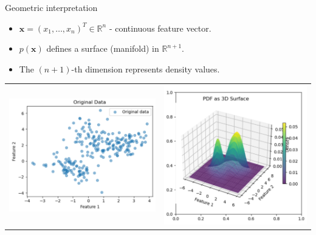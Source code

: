 \documentclass{beamer}
\newcommand{\x}{\mathbf{x}}
\begin{document}
\begin{frame}{Geometric interpretation}
  \begin{itemize}
  \item $\x = (x_1, \ldots, x_n)^T \in \mathbb{R}^n$ - continuous feature vector.
    \vspace{0.5cm}
  \item $p(\x)$ defines a surface (manifold) in $\mathbb{R}^{n+1}$.
    \vspace{0.5cm}
  \item The $(n+1)$-th dimension represents density values.
  \end{itemize}

  \begin{center}
    \begin{tabular}{cc}
      \includegraphics[scale=0.25]{./figs/original_data.pdf}&
      \includegraphics[scale=0.25]{./figs/PDF.pdf}
    \end{tabular}
  \end{center}
\end{frame}
\end{document}
